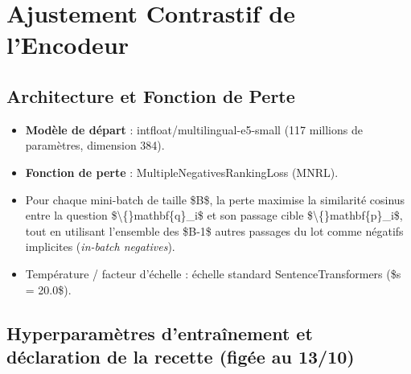 \documentclass[11pt,a4paper]{article}
\newcommand{\code}[1]  {{\ttfamily #1}}
\begin{document}
\section{Ajustement Contrastif de l'Encodeur}

\subsection{Architecture et Fonction de Perte}
\begin{itemize}
\item \textbf{Modèle de départ} : \code{intfloat/\allowbreak{}multilingual-\allowbreak{}e5-\allowbreak{}small} (117 millions de paramètres, dimension 384).
\item \textbf{Fonction de perte} : \code{MultipleNegativesRankingLoss} (MNRL).
\item Pour chaque mini-batch de taille \$B\$, la perte maximise la similarité cosinus entre la question \$\textbackslash\{\}mathbf\{q\}\_i\$ et son passage cible \$\textbackslash\{\}mathbf\{p\}\_i\$, tout en utilisant l'ensemble des \$B-1\$ autres passages du lot comme négatifs implicites (\textit{in-batch negatives}).
\item Température / facteur d'échelle : échelle standard SentenceTransformers (\$s = 20.0\$).
\end{itemize}

\subsection{Hyperparamètres d'entraînement et déclaration de la recette (figée au 13/10)}
\end{document}
